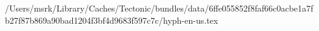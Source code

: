 /Users/msrk/Library/Caches/Tectonic/bundles/data/6ffe055852f8faf66c0acbe1a7fb27f87b869a90bad1204f3bf4d9683f597c7c/hyph-en-us.tex